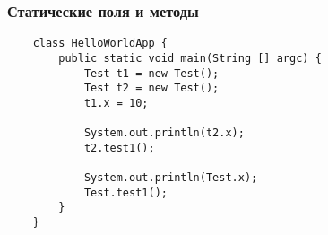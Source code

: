 \begin{frame}[fragile]
	\frametitle{Статические поля и методы}
	\begin{verbatim}
	class HelloWorldApp {
	    public static void main(String [] argc) {
	        Test t1 = new Test();
	        Test t2 = new Test();
	        t1.x = 10;

	        System.out.println(t2.x);
	        t2.test1();

	        System.out.println(Test.x);
	        Test.test1();
	    }
	}
	\end{verbatim}

\end{frame}

